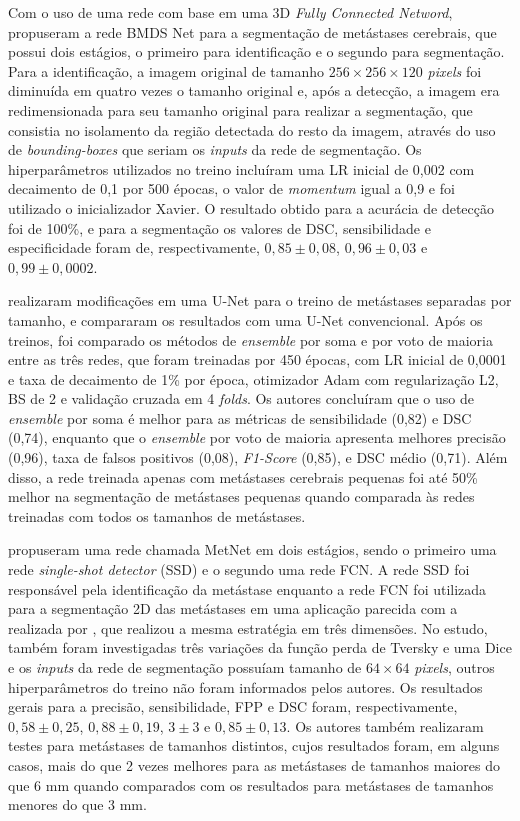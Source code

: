 Com o uso de uma rede com base em uma 3D \textit{Fully Connected Netword}, \cite{Xue:2020} propuseram a rede BMDS Net para a segmentação de metástases cerebrais, que possui dois estágios, o primeiro para identificação e o segundo para segmentação. Para a identificação, a imagem original de tamanho $256\times256\times120$ \textit{pixels} foi diminuída em quatro vezes o tamanho original e, após a detecção, a imagem era redimensionada para seu tamanho original para realizar a segmentação, que consistia no isolamento da região detectada do resto da imagem, através do uso de \textit{bounding-boxes} que seriam os \textit{inputs} da rede de segmentação. Os hiperparâmetros utilizados no treino incluíram uma LR inicial de 0,002 com decaimento de 0,1 por 500 épocas, o valor de \textit{momentum} igual a 0,9 e foi utilizado o inicializador Xavier. O resultado obtido para a acurácia de detecção foi de 100\%, e para a segmentação os valores de DSC, sensibilidade e especificidade foram de, respectivamente, $0,85 \pm 0,08$, $0,96 \pm 0,03$ e $0,99 \pm 0,0002$.

\cite{Bousabarah:2020} realizaram modificações em uma U-Net para o treino de metástases separadas por tamanho, e compararam os resultados com uma U-Net convencional. Após os treinos, foi comparado os métodos de \textit{ensemble} por soma e por voto de maioria entre as três redes, que foram treinadas por 450 épocas, com LR inicial de 0,0001 e taxa de decaimento de 1\% por época, otimizador Adam com regularização L2, BS de 2 e validação cruzada em 4 \textit{folds}. Os autores concluíram que o uso de \textit{ensemble} por soma é melhor para as métricas de sensibilidade (0,82) e DSC (0,74), enquanto que o \textit{ensemble} por voto de maioria apresenta melhores precisão (0,96), taxa de falsos positivos (0,08), \textit{F1-Score} (0,85), e DSC médio (0,71). Além disso, a rede treinada apenas com metástases cerebrais pequenas foi até 50\% melhor na segmentação de metástases pequenas quando comparada às redes treinadas com todos os tamanhos de metástases.

\cite{Zhou:2020} propuseram uma rede chamada MetNet em dois estágios, sendo o primeiro uma rede \textit{single-shot detector} (SSD) e o segundo uma rede FCN. A rede SSD foi responsável pela identificação da metástase enquanto a rede FCN foi utilizada para a segmentação 2D das metástases em uma aplicação parecida com a realizada por \cite{Xue:2020}, que realizou a mesma estratégia em três dimensões. No estudo, também foram investigadas três variações da função perda de Tversky e uma Dice e os \textit{inputs} da rede de segmentação possuíam tamanho de $64\times64$ \textit{pixels}, outros hiperparâmetros do treino não foram informados pelos autores. Os resultados gerais para a precisão, sensibilidade, FPP e DSC foram, respectivamente, $0,58 \pm 0,25$, $0,88 \pm 0,19$, $3 \pm 3$ e $0,85 \pm 0,13$. Os autores também realizaram testes para metástases de tamanhos distintos, cujos resultados foram, em alguns casos, mais do que 2 vezes melhores para as metástases de tamanhos maiores do que 6 mm quando comparados com os resultados para metástases de tamanhos menores do que 3 mm.

